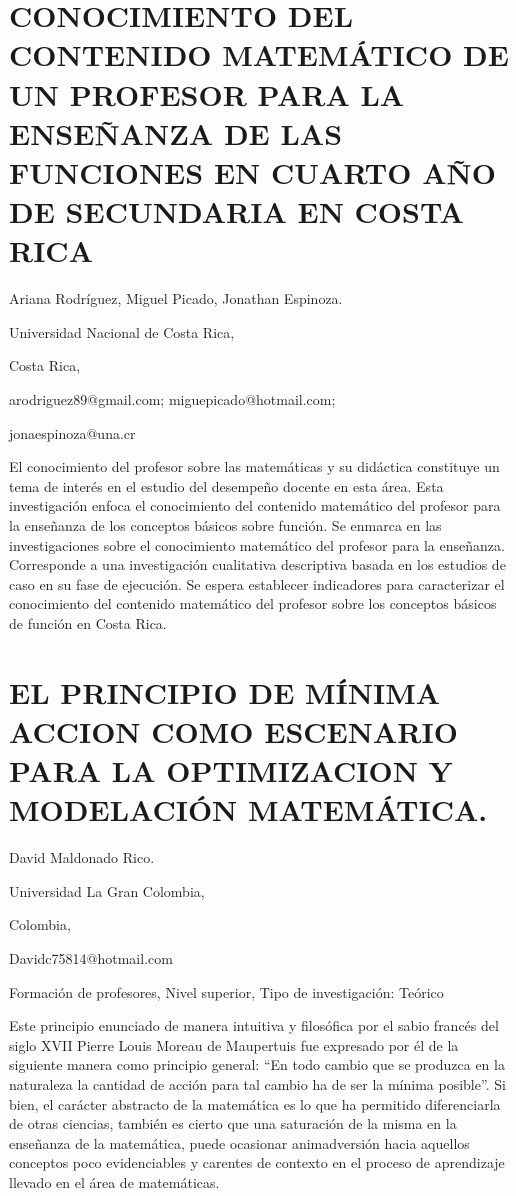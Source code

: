 \setcounter{section}{32}


\section{CONOCIMIENTO DEL CONTENIDO MATEMÁTICO DE UN PROFESOR PARA LA ENSEÑANZA
DE LAS FUNCIONES EN CUARTO AÑO DE SECUNDARIA EN COSTA RICA }

\begin{datos}

Ariana Rodríguez, Miguel Picado, Jonathan Espinoza.

Universidad Nacional de Costa Rica,

Costa Rica,

arodriguez89@gmail.com; miguepicado@hotmail.com;

jonaespinoza@una.cr

\end{datos}

El conocimiento del profesor sobre las matemáticas y su didáctica
constituye un tema de interés en el estudio del desempeño docente
en esta área. Esta investigación enfoca el conocimiento del contenido
matemático del profesor para la enseñanza de los conceptos básicos
sobre función. Se enmarca en las investigaciones sobre el conocimiento
matemático del profesor para la enseñanza. Corresponde a una investigación
cualitativa descriptiva basada en los estudios de caso en su fase
de ejecución. Se espera establecer indicadores para caracterizar el
conocimiento del contenido matemático del profesor sobre los conceptos
básicos de función en Costa Rica.


\section{EL PRINCIPIO DE MÍNIMA ACCION COMO ESCENARIO PARA LA OPTIMIZACION
Y MODELACIÓN MATEMÁTICA. }

\begin{datos}

David Maldonado Rico.

Universidad La Gran Colombia,

Colombia,

Davidc75814@hotmail.com 

\end{datos}

Formación de profesores, Nivel superior, Tipo de investigación: Teórico

Este principio enunciado de manera intuitiva y filosófica por el sabio
francés del siglo XVII Pierre Louis Moreau de Maupertuis fue expresado
por él de la siguiente manera como principio general: “En todo cambio
que se produzca en la naturaleza la cantidad de acción para tal cambio
ha de ser la mínima posible”. Si bien, el carácter abstracto de la
matemática es lo que ha permitido diferenciarla de otras ciencias,
también es cierto que una saturación de la misma en la enseñanza de
la matemática, puede ocasionar animadversión hacia aquellos conceptos
poco evidenciables y carentes de contexto en el proceso de aprendizaje
llevado en el área de matemáticas.


